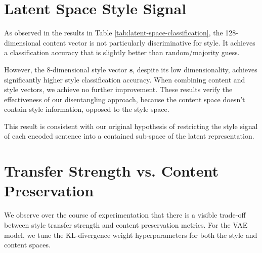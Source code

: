 \section{Latent Space Style Signal}

As observed in the results in Table \ref{tab:latent-space-classification}, the 128-dimensional content vector is not particularly discriminative for style. It achieves a classification accuracy that is slightly better than random/majority guess.

However, the 8-dimensional style vector $\bm s$, despite its low dimensionality, achieves significantly higher style classification accuracy. When combining content and style vectors, we achieve no further improvement. These results verify the effectiveness of our disentangling approach, because the content space doesn't contain style information, opposed to the style space.

This result is consistent with our original hypothesis of restricting the style signal of each encoded sentence into a contained sub-space of the latent representation.


\section{Transfer Strength vs. Content Preservation}

We observe over the course of experimentation that there is a visible trade-off between style transfer strength and content preservation metrics. For the VAE model, we tune the KL-divergence weight hyperparameters for both the style and content spaces.

